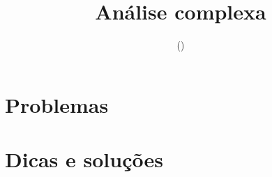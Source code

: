 \documentclass[brazilian,a4paper]{scrartcl}
\author{\gitAuthorName}
\title{\gato  Análise complexa  \gato}
\date{\textrm{\gitAbbrevHash} \quad (\gitAuthorDate)}
\begin{document}
\maketitle
\tableofcontents

\appendix
\newpage
\section{Problemas}

\newpage
\section{Dicas e soluções}

\end{document}
